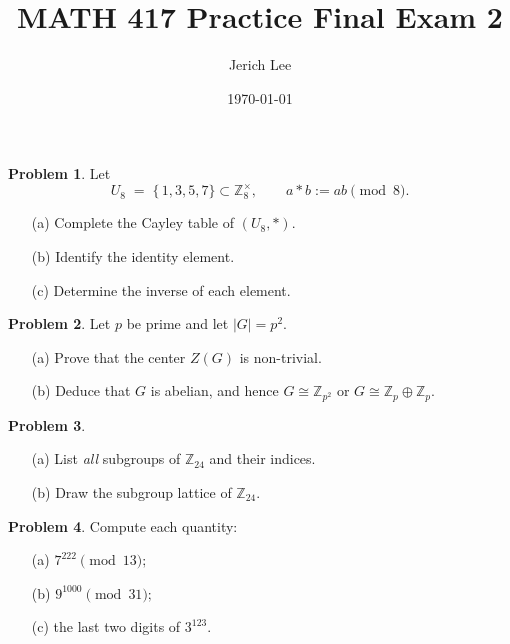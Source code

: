 \documentclass[12pt]{article}
\title{MATH 417 Practice Final Exam 2}
\author{Jerich Lee}
\date{\today}
\theoremstyle{definition} %
\newtheorem{problem}{Problem}
\theoremstyle{plain} %
\begin{document}
\maketitle
\newcommand{\Z}{\mathbb Z}
\newcommand{\Q}{\mathbb Q}
\newcommand{\R}{\mathbb R}

\bigskip
\begin{problem}
  Let
  \[
     U_{8}\;=\;\{\,1,3,5,7\}
     \subset\Z_{8}^{\times},
     \qquad
     a\ast b:=ab\pmod{8}.
  \]
  \begin{enumerate}
      \item[(a)] Complete the Cayley table of \((U_{8},\ast)\).
      \item[(b)] Identify the identity element.
      \item[(c)] Determine the inverse of each element.
  \end{enumerate}
\end{problem}

\bigskip
\begin{problem}
  Let \(p\) be prime and let \(|G|=p^{2}\).
  \begin{enumerate}
      \item[(a)] Prove that the center \(Z(G)\) is non-trivial.
      \item[(b)] Deduce that \(G\) is abelian, and hence
                \(G\cong\Z_{p^{2}}\) or \(G\cong\Z_{p}\oplus\Z_{p}\).
  \end{enumerate}
\end{problem}

\bigskip
\begin{problem}
  \begin{enumerate}
      \item[(a)] List \emph{all} subgroups of \(\Z_{24}\) and their indices.
      \item[(b)] Draw the subgroup lattice of \(\Z_{24}\).
  \end{enumerate}
\end{problem}

\bigskip
\begin{problem}
  Compute each quantity:
  \begin{enumerate}
      \item[(a)] \(7^{222}\pmod{13};\)
      \item[(b)] \(9^{1000}\pmod{31};\)
      \item[(c)] the last two digits of \(3^{123}\).
  \end{enumerate}
\end{problem}
\end{document}

